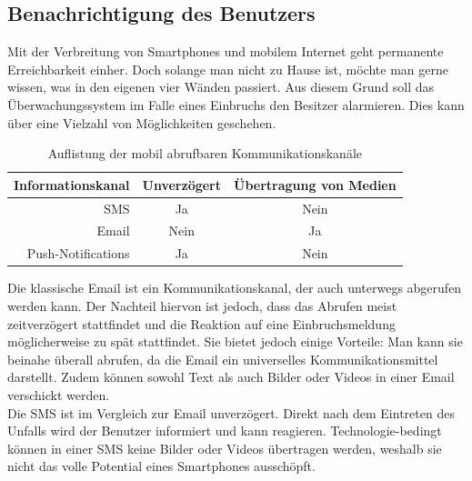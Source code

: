 \subsection{Benachrichtigung des Benutzers}\label{ss:benachrichtigung}

Mit der Verbreitung von Smartphones und mobilem Internet geht permanente Erreichbarkeit einher. Doch solange man nicht zu Hause ist, möchte man gerne wissen, was in den eigenen vier Wänden passiert. Aus diesem Grund soll das Überwachungssystem im Falle eines Einbruchs den Besitzer alarmieren. Dies kann über eine Vielzahl von Möglichkeiten geschehen. 

\vspace{5 mm}
\begin{table}[H] 
	\centering
	\begin{tabular}{|r||c|c|}\hline
		Informationskanal & Unverzögert & Übertragung von Medien\\ \hline \hline
		SMS & Ja & Nein \\ \hline
		Email & Nein & Ja \\ \hline
		Push-Notifications & Ja & Nein \\ \hline
	\end{tabular}
	\caption{Auflistung der mobil abrufbaren Kommunikationskanäle}
	\label{t:benachrichtugung}
\end{table}

Die klassische Email ist ein Kommunikationskanal, der auch unterwegs abgerufen werden kann. Der Nachteil hiervon ist jedoch, dass das Abrufen meist zeitverzögert stattfindet und die Reaktion auf eine Einbruchsmeldung möglicherweise zu spät stattfindet. Sie bietet jedoch einige Vorteile: Man kann sie beinahe überall abrufen, da die Email ein universelles Kommunikationsmittel darstellt. Zudem können sowohl Text als auch Bilder oder Videos in einer Email verschickt werden.\\

Die SMS ist im Vergleich zur Email unverzögert.  Direkt nach dem Eintreten des Unfalls wird der Benutzer informiert und kann reagieren. Technologie-bedingt können in einer SMS keine Bilder oder Videos übertragen werden, weshalb sie nicht das volle Potential eines Smartphones ausschöpft.\\


